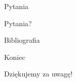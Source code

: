 \begin{frame}{Pytania}
    \begin{center}
        {\huge Pytania?}
    \end{center}
\end{frame}

\begin{frame}[allowframebreaks]{Bibliografia}
    \printbibliography
\end{frame}

     

\begin{frame}{Koniec}
    \begin{center}
        {\huge Dziękujemy za uwagę!}
    \end{center}
\end{frame}

\pglastframe